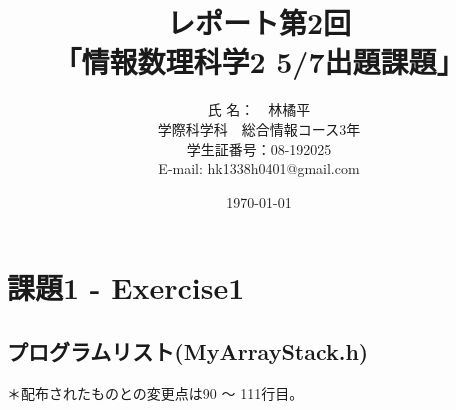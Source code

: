 \documentclass[11pt,a4paper]{jsarticle}
\title{レポート第2回 \\
  「情報数理科学2 5/7出題課題」}
\author{氏 名：　林橘平\\
        学際科学科　総合情報コース3年 \\
        学生証番号：08-192025 \\
        E-mail: hk1338h0401@gmail.com}
\date{\today}
\begin{document}
\maketitle
%
\section{課題1 - Exercise1}
\subsection{プログラムリスト(MyArrayStack.h)}
＊配布されたものとの変更点は90 〜 111行目。
\label{sec:prog-list1}
\end{document}
